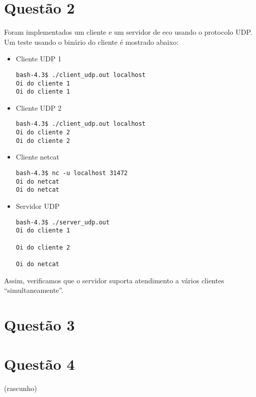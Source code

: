 \documentclass[a4paper,10pt]{article}
\begin{document}
\section{Questão 2}

Foram implementados um cliente e um servidor de eco usando o protocolo UDP. Um teste usando o binário do cliente é mostrado abaixo:

\begin{itemize}
\item Cliente UDP 1

\begin{lstlisting}
bash-4.3$ ./client_udp.out localhost
Oi do cliente 1
Oi do cliente 1

\end{lstlisting}

\item Cliente UDP 2

\begin{lstlisting}
bash-4.3$ ./client_udp.out localhost
Oi do cliente 2
Oi do cliente 2

\end{lstlisting}

\item Cliente netcat

\begin{lstlisting}
bash-4.3$ nc -u localhost 31472
Oi do netcat   
Oi do netcat

\end{lstlisting}


\item Servidor UDP

\begin{lstlisting}
bash-4.3$ ./server_udp.out
Oi do cliente 1

Oi do cliente 2

Oi do netcat   

\end{lstlisting}
\end{itemize}

Assim, verificamos que o servidor suporta atendimento a vários clientes ``simultaneamente''.

\section{Questão 3}


\section{Questão 4}
(rascunho)
\end{document}
